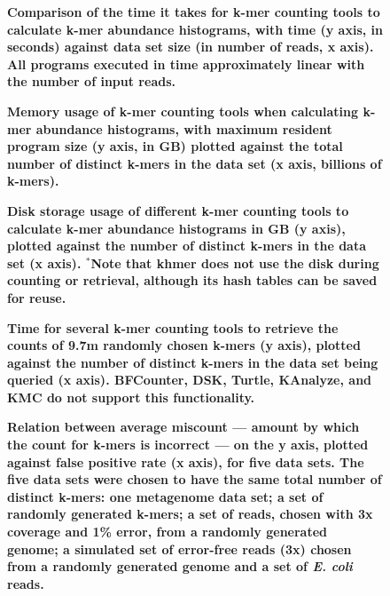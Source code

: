 
\begin{figure}[!ht]

\caption{\bf Comparison of the time it takes for k-mer counting tools
  to calculate k-mer abundance histograms, with time (y axis, in
  seconds) against data set size (in number of reads, x axis).  
  All programs executed in time approximately linear with
  the number of input reads.}

\label{fig:cmp_time}
\end{figure}

\begin{figure}[!ht]

\caption{\bf Memory usage of k-mer counting tools when calculating
  k-mer abundance histograms, with maximum resident program size (y
  axis, in GB) plotted against the total number of distinct k-mers in
  the data set (x axis, billions of k-mers). }

\label{fig:cmp_memory}
\end{figure}

\begin{figure}[!ht]

\caption{\bf Disk storage usage of different k-mer counting tools to
  calculate k-mer abundance histograms in GB (y axis), plotted against
  the number of distinct k-mers in the data set (x axis).  $^*$Note
  that khmer does not use the disk during counting or retrieval,
  although its hash tables can be saved for reuse.}

\label{fig:cmp_disk}
\end{figure}

\begin{figure}[!ht]
\caption{\bf Time for several k-mer counting tools to retrieve the
  counts of 9.7m randomly chosen k-mers (y axis), plotted against the
  number of distinct k-mers in the data set being queried (x axis).
  BFCounter, DSK, Turtle, KAnalyze, and KMC do not support this functionality.}
\label{fig:cmp_count}
\end{figure}

\begin{figure}[!ht]
\caption{\bf Relation between average miscount --- amount by which
the count for k-mers is incorrect --- on the y axis, plotted against
false positive rate (x axis), for five data sets.  The five data
sets were chosen to have the same total number of distinct k-mers: one
metagenome data set; a set of randomly generated k-mers; a set
of reads, chosen with 3x coverage and 1\% error, from a randomly generated
genome; a simulated set of error-free reads (3x) chosen from a randomly
generated genome and a set of {\em E. coli} reads.}
\label{fig:average_offset_vs_fpr}
\end{figure}

